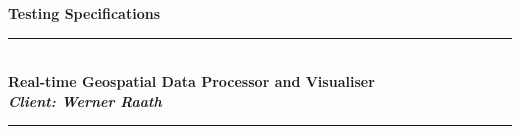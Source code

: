 \documentclass[a4paper,12pt]{article}
\begin{document}
	
\begin{titlepage}
	\newcommand{\HRule}{\rule{\linewidth}{0.5mm}} %

	\center %
	 
	
	
	{ \huge \bfseries Testing Specifications}\\\HRule \\[0.4cm] %
	\Large \textbf{Real-time Geospatial Data Processor and Visualiser} \\
	\small \emph{\textbf{Client: Werner Raath}}
	\HRule \\[1.5cm]
	 

\end{titlepage}
\end{document}
